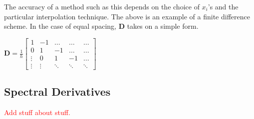 \documentclass[12pt,letterpaper]{article}
\numberwithin{equation}{section}
\begin{document}
The accuracy of a method such as this depends on the choice of $x_i$'s and the particular interpolation technique. The above is an example of a finite difference scheme. In the case of equal spacing, $\boldsymbol{D}$ takes on a simple form.

\begin{center}
$
\boldsymbol{D}
= \frac{1}{h}
\begin{bmatrix}
	1 & -1 & \dots & \dots & \dots \\ 
	0 & 1 & -1 & \dots & \dots \\
	\vdots & 0 & 1 & -1 & \dots \\
	\vdots & \vdots & \ddots & \ddots & \ddots
\end{bmatrix}
$
\end{center}

\subsection{Spectral Derivatives}
\begin{center}
\textcolor{red}{Add stuff about stuff.}
\end{center}
\end{document}
